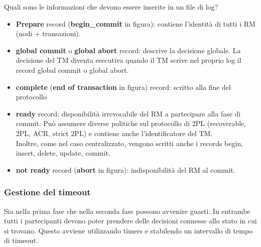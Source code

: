 Quali sono le informazioni che devono essere inserite in un file di log?
\begin{itemize}
    \item \textbf{Prepare} record (\textbf{begin\_commit} in figura): contiene l’identità di tutti i RM (nodi + transazioni).
    \item \textbf{global commit} o \textbf{global abort} record: descrive la decisione globale. La decisione del TM diventa esecutiva quando il TM scrive nel proprio log il record global commit o global abort.
    \item \textbf{complete} (\textbf{end of transaction} in figura) record: scritto alla fine del protocollo
    \item \textbf{ready} record: disponibilità irrevocabile del RM a partecipare alla fase di commit. Può assumere diverse politiche sul protocollo di 2PL (recoverable, 2PL, ACR, strict 2PL) e contiene anche l’identificatore del TM.\\    Inoltre, come nel caso centralizzato, vengono scritti anche i records begin, insert, delete, update, commit. 
    \item \textbf{not ready} record (\textbf{abort} in figura): indisponibilità del RM al commit.
\end{itemize}

\subsubsection{Gestione del timeout}
Sia nella prima fase che nella seconda fase possono avvenire guasti. In entrambe tutti i partecipanti devono poter prendere delle decisioni connesse allo stato in cui si trovano. Questo avviene utilizzando timers e stabilendo un intervallo di tempo di timeout.

